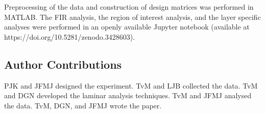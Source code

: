 \documentclass[9pt,lineno]{aperture}
\begin{document}
Preprocessing of the data and construction of design matrices was performed in MATLAB. The FIR analysis, the region of interest analysis, and the layer specific analyses were performed in an openly available Jupyter notebook (available at https://doi.org/10.5281/zenodo.3428603).

\subsection{Author Contributions}
PJK and JFMJ designed the experiment. TvM and LJB collected the data. TvM and DGN developed the laminar analysis techniques. TvM and JFMJ analysed the data. TvM, DGN, and JFMJ wrote the paper. 




\end{document}
